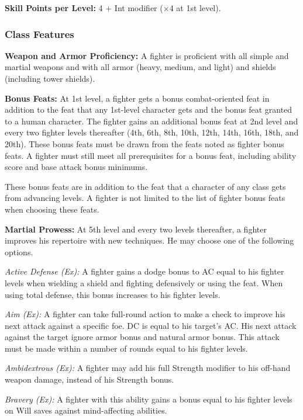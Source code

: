 \textbf{Skill Points per Level:} 4 + Int modifier ($\times4$ at 1st level).

\subsubsection{Class Features}
\textbf{Weapon and Armor Proficiency:} A fighter is proficient with all simple and martial weapons and with all armor (heavy, medium, and light) and shields (including tower shields).

\textbf{Bonus Feats:} At 1st level, a fighter gets a bonus combat-oriented feat in addition to the feat that any 1st-level character gets and the bonus feat granted to a human character. The fighter gains an additional bonus feat at 2nd level and every two fighter levels thereafter (4th, 6th, 8th, 10th, 12th, 14th, 16th, 18th, and 20th). These bonus feats must be drawn from the feats noted as fighter bonus feats. A fighter must still meet all prerequisites for a bonus feat, including ability score and base attack bonus minimums.

These bonus feats are in addition to the feat that a character of any class gets from advancing levels. A fighter is not limited to the list of fighter bonus feats when choosing these feats.

\textbf{Martial Prowess:} At 5th level and every two levels thereafter, a fighter improves his repertoire with new techniques. He may choose one of the following options.

\textit{Active Defense (Ex):} A fighter gains a dodge bonus to AC equal to \onequarter his fighter levels when wielding a shield and fighting defensively or using the  feat. When using total defense, this bonus increases to \onehalf his fighter levels.

\textit{Aim (Ex):} A fighter can take full-round action to make a  check to improve his next attack against a specific foe. DC is equal to his target's AC. His next attack against the target ignore armor bonus and natural armor bonus. This attack must be made within a number of rounds equal to \onequarter his fighter levels.

\textit{Ambidextrous (Ex):} A fighter may add his full Strength modifier to his off-hand weapon damage, instead of \onehalf his Strength bonus.

\textit{Bravery (Ex):} A fighter with this ability gains a bonus equal to \onehalf his fighter levels on Will saves against mind-affecting abilities.

